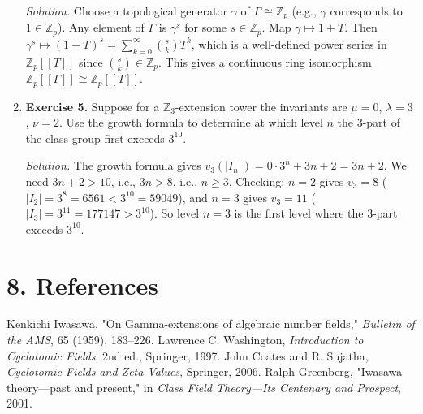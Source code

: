 \begin{enumerate}[leftmargin=*,itemsep=0.9em]
\emph{Solution.} Choose a topological generator $\gamma$ of $\Gamma\cong\mathbb{Z}_p$ (e.g., $\gamma$ corresponds to $1\in\mathbb{Z}_p$). Any element of $\Gamma$ is $\gamma^s$ for some $s\in\mathbb{Z}_p$. Map $\gamma\mapsto 1+T$. Then $\gamma^s\mapsto(1+T)^s=\sum_{k=0}^{\infty}\binom{s}{k}T^k$, which is a well-defined power series in $\mathbb{Z}_p[[T]]$ since $\binom{s}{k}\in\mathbb{Z}_p$. This gives a continuous ring isomorphism $\mathbb{Z}_p[[\Gamma]]\cong\mathbb{Z}_p[[T]]$.

\item \textbf{Exercise 5.} Suppose for a $\mathbb{Z}_3$-extension tower the invariants are $\mu=0$, $\lambda=3$, $\nu=2$. Use the growth formula to determine at which level $n$ the $3$-part of the class group first exceeds $3^{10}$.

\emph{Solution.} The growth formula gives $v_3(|I_n|)=0\cdot 3^n+3n+2=3n+2$. We need $3n+2>10$, i.e., $3n>8$, i.e., $n\geq 3$. Checking: $n=2$ gives $v_3=8$ ($|I_2|=3^8=6561<3^{10}=59049$), and $n=3$ gives $v_3=11$ ($|I_3|=3^{11}=177147>3^{10}$). So level $n=3$ is the first level where the $3$-part exceeds $3^{10}$.

\end{enumerate}
\section*{8. References}

\begin{thebibliography}{9}
 Kenkichi Iwasawa, "On Gamma-extensions of algebraic number fields," \emph{Bulletin of the AMS}, 65 (1959), 183--226.
 Lawrence C. Washington, \emph{Introduction to Cyclotomic Fields}, 2nd ed., Springer, 1997.
 John Coates and R. Sujatha, \emph{Cyclotomic Fields and Zeta Values}, Springer, 2006.
 Ralph Greenberg, "Iwasawa theory---past and present," in \emph{Class Field Theory---Its Centenary and Prospect}, 2001.
\end{thebibliography}

